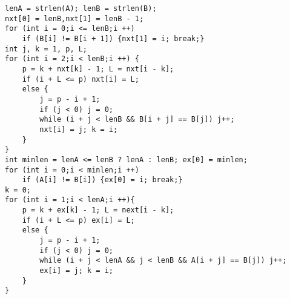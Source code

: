 \begin{lstlisting}
lenA = strlen(A); lenB = strlen(B);
nxt[0] = lenB,nxt[1] = lenB - 1;
for (int i = 0;i <= lenB;i ++)
	if (B[i] != B[i + 1]) {nxt[1] = i; break;}
int j, k = 1, p, L;
for (int i = 2;i < lenB;i ++) {
	p = k + nxt[k] - 1; L = nxt[i - k];
	if (i + L <= p) nxt[i] = L;
	else {
		j = p - i + 1;
		if (j < 0) j = 0;
		while (i + j < lenB && B[i + j] == B[j]) j++;
		nxt[i] = j; k = i;
	}
}
int minlen = lenA <= lenB ? lenA : lenB; ex[0] = minlen;
for (int i = 0;i < minlen;i ++)
	if (A[i] != B[i]) {ex[0] = i; break;}
k = 0;
for (int i = 1;i < lenA;i ++){
	p = k + ex[k] - 1; L = next[i - k];
	if (i + L <= p) ex[i] = L;
	else {
		j = p - i + 1;
		if (j < 0) j = 0;
		while (i + j < lenA && j < lenB && A[i + j] == B[j]) j++;
		ex[i] = j; k = i;
	}
}
\end{lstlisting}
